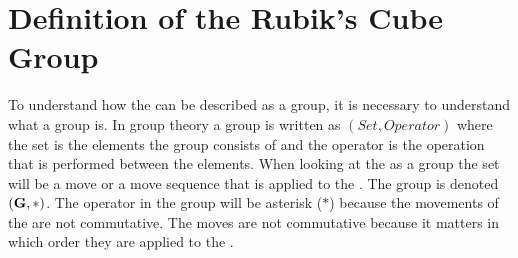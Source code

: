 \section{Definition of the Rubik's Cube Group}
\label{sec:groupDefinition}
To understand how the \rubik{} can be described as a group, it is necessary to understand what a group is.
In group theory a group is written as $(Set, Operator)$ where the set is the elements the group consists of and the operator is the operation that is performed between the elements.
 When looking at the \rubik{} as a group the set will be a move or a move sequence that is applied to the \rubik{}. The group is denoted $(\textbf{G},*)$.
The operator in the \rubik{} group will be asterisk ($*$) because the movements of the \rubik{} are not commutative. 
 The moves are not commutative because it matters in which order they are applied to the \rubik{} \cite[p. 157]{Rubik87}.

